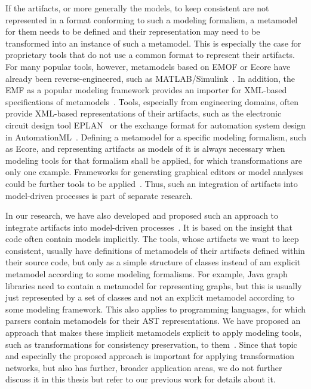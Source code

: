 If the artifacts, or more generally the models, to keep consistent are not represented in a format conforming to such a modeling formalism, a metamodel for them needs to be defined and their representation may need to be transformed into an instance of such a metamodel.
This is especially the case for proprietary tools that do not use a common format to represent their artifacts.
For many popular tools, however, metamodels based on \gls{EMOF} or Ecore have already been reverse-engineered, such as 
MATLAB/Simulink~\cite{heinzemann2013Reconfiguration-CBSE,son2012Simulink-CAGGIE,armengaud2011Safety-WCE}.
In addition, the \gls{EMF} as a popular modeling framework provides an importer for XML-based specifications of metamodels~\cite[pp.\ 86]{steinberg2009emf}.
Tools, especially from engineering domains, often provide XML-based representations of their artifacts, such as the electronic circuit design tool EPLAN~\cite{eplan} or the exchange format for automation system design in AutomationML~\cite{automationML}.
Defining a metamodel for a specific modeling formalism, such as Ecore, and representing artifacts as models of it is always necessary when modeling tools for that formalism shall be applied, for which transformations are only one example.
Frameworks for generating graphical editors or model analyses could be further tools to be applied~.
Thus, such an integration of artifacts into model-driven processes is part of separate research.

In our research, we have also developed and proposed such an approach to integrate artifacts into model-driven processes~.
It is based on the insight that code often contain models implicitly.
The tools, whose artifacts we want to keep consistent, usually have definitions of metamodels of their artifacts defined within their source code, but only as a simple structure of classes instead of am explicit metamodel according to some modeling formalisms.
For example, Java graph libraries need to contain a metamodel for representing graphs, but this is usually just represented by a set of classes and not an explicit metamodel according to some modeling framework.
This also applies to programming languages, for which parsers contain metamodels for their \gls{AST} representations.
We have proposed an approach that makes these implicit metamodels explicit to apply modeling tools, such as transformations for consistency preservation, to them~.
Since that topic and especially the proposed approach is important for applying transformation networks, but also has further, broader application areas, we do not further discuss it in this thesis but refer to our previous work for details about it.


